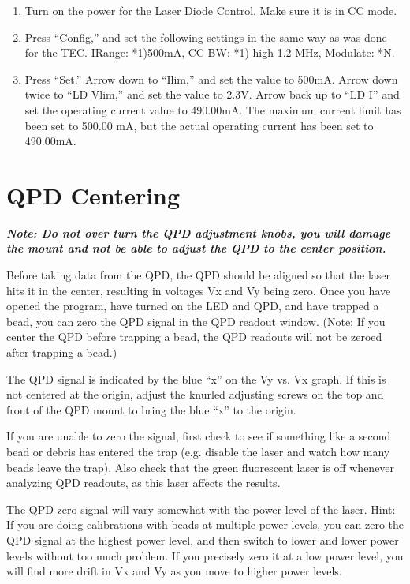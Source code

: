 \documentclass{../lab}
\begin{document}
\begin{enumerate}
    \item Turn on the power for the Laser Diode Control. Make sure it is in CC mode.

    \item Press ``Config,'' and set the following settings in the same way as was done for the TEC. IRange: *1)500mA, CC BW: *1) high 1.2 MHz, Modulate: *N.

    \item Press ``Set.'' Arrow down to ``Ilim,'' and set the value to 500mA. Arrow down twice to ``LD Vlim,'' and set the value to 2.3V. Arrow back up to ``LD I'' and set the operating current value to 490.00mA. The maximum current limit has been set to 500.00 mA, but the actual operating current has been set to 490.00mA.

\end{enumerate}

\section{QPD Centering}

\emph{\textbf{Note: Do not over turn the QPD adjustment knobs, you will damage the mount and not be able to adjust the QPD to the center position.}}

Before taking data from the QPD, the QPD should be aligned so that the laser hits it in the center, resulting in voltages Vx and Vy being zero. Once you have opened the program, have turned on the LED and QPD, and have trapped a bead, you can zero the QPD signal in the QPD readout window. (Note: If you center the QPD before trapping a bead, the QPD readouts will not be zeroed after trapping a bead.)

The QPD signal is indicated by the blue ``x'' on the Vy vs. Vx graph. If this is not centered at the origin, adjust the knurled adjusting screws on the top and front of the QPD mount to bring the blue ``x'' to the origin.

If you are unable to zero the signal, first check to see if something like a second bead or debris has entered the trap (e.g. disable the laser and watch how many beads leave the trap). Also check that the green fluorescent laser is off whenever analyzing QPD readouts, as this laser affects the results.

The QPD zero signal will vary somewhat with the power level of the laser. Hint: If you are doing calibrations with beads at multiple power levels, you can zero the QPD signal at the highest power level, and then switch to lower and lower power levels without too much problem. If you precisely zero it at a low power level, you will find more drift in Vx and Vy as you move to higher power levels.
\end{document}
